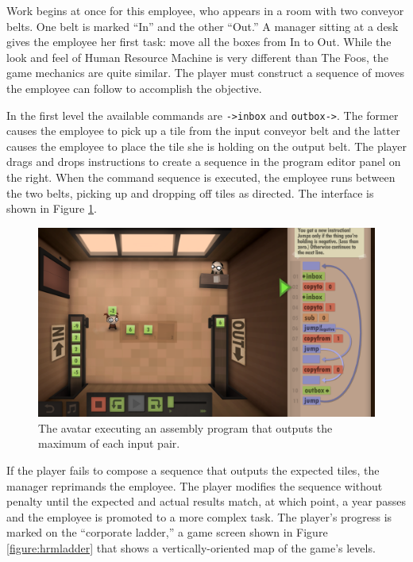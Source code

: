 \documentclass{sig-alternate-05-2015}
\begin{document}
Work begins at once for this employee, who appears in a room with two conveyor belts. One belt is marked ``In'' and the other ``Out.'' A manager sitting at a desk gives the employee her first task: move all the boxes from In to Out. While the look and feel of Human Resource Machine is very different than The Foos, the game mechanics are quite similar. The player must construct a sequence of moves the employee can follow to accomplish the objective. 



In the first level the available commands are {\tt ->inbox} and {\tt outbox->}. The former causes the employee to pick up a tile from the input conveyor belt and the latter causes the employee to place the tile she is holding on the output belt. The player drags and drops instructions to create a sequence in the program editor panel on the right. When the command sequence is executed, the employee runs between the two belts, picking up and dropping off tiles as directed. The interface is shown in Figure \ref{figure:hrmfloor}.





\begin{figure}[tb]
\centering
\includegraphics[width=\linewidth]{images/image03.png}
\caption{The avatar executing an assembly program that outputs the maximum of each input pair.}
\label{figure:hrmfloor}
\end{figure}


If the player fails to compose a sequence that outputs the expected tiles, the manager reprimands the employee. The player modifies the sequence without penalty until the expected and actual results match, at which point, a year passes and the employee is promoted to a more complex task. The player's progress is marked on the ``corporate ladder,'' a game screen shown in Figure \ref{figure:hrmladder} that shows a vertically-oriented map of the game's levels.
\end{document}
